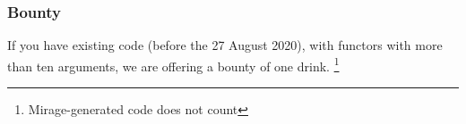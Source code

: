\documentclass[11pt,aspectratio=169]{beamer}
\begin{document}


\begin{frame}\frametitle{Bounty}
  If you have existing code (before the 27 August 2020), with functors with more
  than ten arguments, we are offering a bounty of one drink.%
  \footnote{Mirage-generated code does not count}
  \pause\vspace{2em}
  \begin{center}
  \end{center}
\end{frame}
\end{document}
